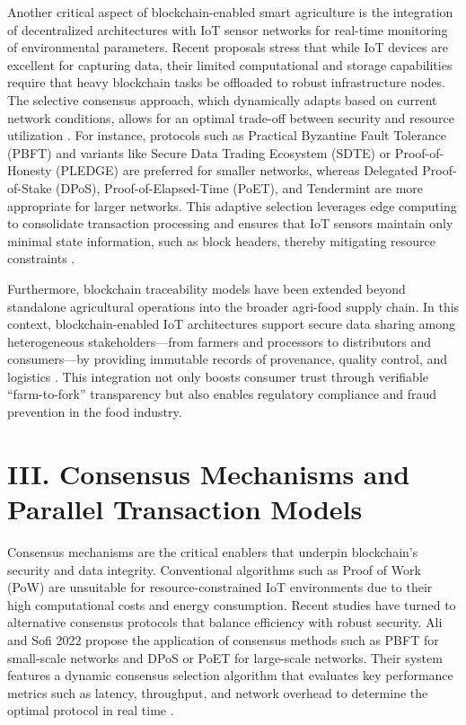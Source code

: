 \documentclass[12pt,onecolumn]{IEEEtran} %
\begin{document}
Another critical aspect of blockchain-enabled smart agriculture is the integration of decentralized architectures with IoT sensor networks for real-time monitoring of environmental parameters. Recent proposals stress that while IoT devices are excellent for capturing data, their limited computational and storage capabilities require that heavy blockchain tasks be offloaded to robust infrastructure nodes. The selective consensus approach, which dynamically adapts based on current network conditions, allows for an optimal trade-off between security and resource utilization \cite{ali2022blockchainenabledarchitecture}. For instance, protocols such as Practical Byzantine Fault Tolerance (PBFT) and variants like Secure Data Trading Ecosystem (SDTE) or Proof-of-Honesty (PLEDGE) are preferred for smaller networks, whereas Delegated Proof-of-Stake (DPoS), Proof-of-Elapsed-Time (PoET), and Tendermint are more appropriate for larger networks. This adaptive selection leverages edge computing to consolidate transaction processing and ensures that IoT sensors maintain only minimal state information, such as block headers, thereby mitigating resource constraints \cite{ali2022blockchainenabledarchitecture}.

Furthermore, blockchain traceability models have been extended beyond standalone agricultural operations into the broader agri-food supply chain. In this context, blockchain-enabled IoT architectures support secure data sharing among heterogeneous stakeholders---from farmers and processors to distributors and consumers---by providing immutable records of provenance, quality control, and logistics \cite{demestichas2020blockchaininagriculture, bosona2023theroleof}. This integration not only boosts consumer trust through verifiable ``farm-to-fork'' transparency but also enables regulatory compliance and fraud prevention in the food industry.

\section*{III. Consensus Mechanisms and Parallel Transaction Models}

Consensus mechanisms are the critical enablers that underpin blockchain's security and data integrity. Conventional algorithms such as Proof of Work (PoW) are unsuitable for resource-constrained IoT environments due to their high computational costs and energy consumption. Recent studies have turned to alternative consensus protocols that balance efficiency with robust security. Ali and Sofi 2022 propose the application of consensus methods such as PBFT for small-scale networks and DPoS or PoET for large-scale networks. Their system features a dynamic consensus selection algorithm that evaluates key performance metrics such as latency, throughput, and network overhead to determine the optimal protocol in real time \cite{ali2022blockchainenabledarchitecture}.
\end{document}
